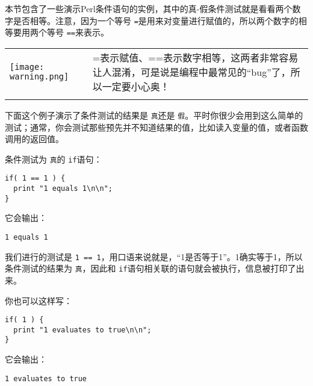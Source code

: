 本节包含了一些演示Perl条件语句的实例，其中的真-假条件测试就是看看两个数字是否相等。注意，因为一个等号 \verb|=|是用来对变量进行赋值的，所以两个数字的相等要用两个等号 \verb|==|来表示。

\vspace{-5pt}
\begin{table}[h]
  \begin{center}
    \begin{tabu} to 0.85\linewidth {|X[1,r,m]X[15,l,m]|}
      \tabucline{-}
      \texttt{[image: warning.png]} & =表示赋值、==表示数字相等，这两者非常容易让人混淆，可是说是编程中最常见的“bug”了，所以一定要小心奥！\\
      \tabucline{-}
    \end{tabu}
  \end{center}
\end{table}
\vspace{-20pt}

下面这个例子演示了条件测试的结果是 \verb|真|还是 \verb|假|。平时你很少会用到这么简单的测试；通常，你会测试那些预先并不知道结果的值，比如读入变量的值，或者函数调用的返回值。

条件测试为 \verb|真|的 \verb|if|语句：

\begin{lstlisting}
if( 1 == 1 ) {
  print "1 equals 1\n\n";
}
\end{lstlisting}

它会输出：

\begin{lstlisting}
1 equals 1
\end{lstlisting}

我们进行的测试是 \verb|1 == 1|，用口语来说就是，“1是否等于1”。1确实等于1，所以条件测试的结果为 \verb|真|，因此和 \verb|if|语句相关联的语句就会被执行，信息被打印了出来。

你也可以这样写：

\begin{lstlisting}
if( 1 ) {
  print "1 evaluates to true\n\n";
}
\end{lstlisting}

它会输出：

\begin{lstlisting}
1 evaluates to true
\end{lstlisting}

